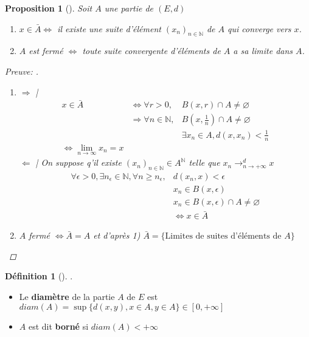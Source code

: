 \documentclass{article}
\theoremstyle{plain}%
\newtheorem{prop}[thm]{Proposition}
\theoremstyle{definition}
\newtheorem{defn}{Définition}[section]
\theoremstyle{remark}
\begin{document}
\begin{prop}[]
    Soit $ A $ une partie de $ (E,d) $ 
    \begin{enumerate}
        \item $ x \in \bar{A} \Leftrightarrow$ il existe une suite d'élément $ (x_n)_{n \in \mathbb{N}} $  de $ A $ qui converge vers $ x $.
        \item $ A $ est fermé $ \Leftrightarrow $ toute suite convergente d'éléments de $ A $ a sa limite dans $ A $.
    \end{enumerate}
    \begin{proof}[Preuve: ]
        \begin{enumerate}
            \item $ \Rightarrow $ | \begin{align*}
                x \in \bar{A} &\Leftrightarrow \forall r>0, &B(x,r) \cap A \neq \varnothing \\
                    &\Rightarrow \forall n \in \mathbb{N}, &B(x, \frac{1}{n}) \cap A \neq \varnothing \\
                    & &\exists x_n \in A, d(x,x_n)<\frac{1}{n} \\ 
                    \Leftrightarrow \lim_{n \to \infty} x_n = x
            \end{align*}
            $ \Leftarrow  $ | On suppose q'il existe $ (x_n)_{n \in \mathbb{N}} \in A^{\mathbb{N}}$ telle que $ x_n \to _{n \to +\infty }^d x$ 
            \begin{align*}
                \forall \epsilon > 0, \exists n_\epsilon \in \mathbb{N}, \forall n \geq n_\epsilon, &d(x_n,x) < \epsilon \\
                    & x_n \in B(x,\epsilon ) \\
                    & x_n \in B(x, \epsilon) \cap A \neq \varnothing \\
                    & \Leftrightarrow x \in \bar{A}
            \end{align*}
            \item $ A $ fermé $ \Leftrightarrow \bar{A} = A$ et d'après 1) $ \bar{A} = \{\text{Limites de suites d'éléments de } A\} $ 
        \end{enumerate}
    \end{proof}
\end{prop}

\begin{defn}[]
    .\\
    \begin{itemize}
        \item Le \textbf{diamètre} de la partie $ A $ de $ E $ est $ diam(A) = \sup \{d(x,y), x \in A, y \in A\} \in [0,+\infty]$ 
        \item $ A $ est dit \textbf{borné} si $ diam(A)<+\infty $ 
    \end{itemize}
\end{defn}
\end{document}
